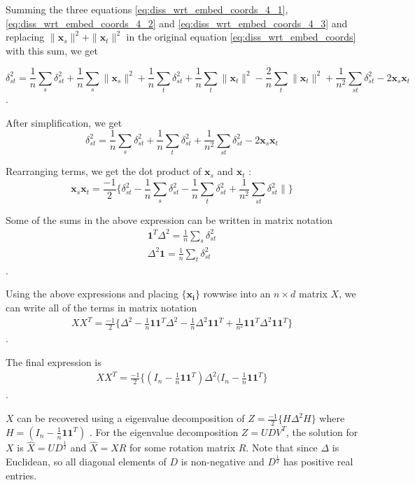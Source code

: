 \documentclass[12pt,oneside,final]{thesis}
\begin{document}
Summing the three equations 
\eqref{eq:diss_wrt_embed_coords_4_1}, \eqref{eq:diss_wrt_embed_coords_4_2}  and  \eqref{eq:diss_wrt_embed_coords_4_3} and replacing   $\|\bm{x}_{s}   \|^2 +\|\bm{x}_{t}\|^2$  in the original equation \eqref{eq:diss_wrt_embed_coords} with this sum, we get 

\[
\delta_{st}^2= \frac{1}{n}\sum_s{ \delta_{st}^2} + \frac{1}{n}\sum_s{\|\bm{x}_{s}}   \|^2 + \frac{1}{n}\sum_t{ \delta_{st}^2} + \frac{1}{n}\sum_t{\|\bm{x}_{t}}  \|^2  -\frac{2}{n}\sum_{t}{\|\bm{x}_{t}   \|^2} +\frac{1}{n^2}\sum_{st}{ \delta_{st}^2}   -2\bm{x}_{s}   \bm{x}_{t}  
\].

After simplification, we get
\[
\delta_{st}^2= \frac{1}{n}\sum_s{ \delta_{st}^2} +  \frac{1}{n}\sum_t{ \delta_{st}^2}  +\frac{1}{n^2}\sum_{st}{ \delta_{st}^2}  -2\bm{x}_{s}   \bm{x}_{t}   
\]

Rearranging terms, we get the dot product of $\bm{x}_{s}$ and $\bm{x}_{t}$ :
\[
\bm{x}_{s}   \bm{x}_{t} = \frac{-1}{2} \{\delta_{st}^2 - \frac{1}{n}\sum_s{ \delta_{st}^2} -  \frac{1}{n}\sum_t{ \delta_{st}^2}  +\frac{1}{n^2}\sum_{st}{ \delta_{st}^2 }     \| \}
\]



Some of the sums in the above expression can be written in matrix notation
\begin{align*}
\bm{1}^{T}\Delta^2= \frac{1}{n}\sum_s{ \delta_{st}^2}\\
\Delta^2 \bm{1} = \frac{1}{n}\sum_t{ \delta_{st}^2}
\end{align*}.

Using the above expressions and placing $\{\bm{x_i}\}$ rowwise into an $n \times d$ matrix $X$, we can write all of the terms in matrix notation
\begin{align*}
XX^T = \frac{-1}{2} \{\Delta^2 -  \frac{1}{n} \bm{1}\bm{1}^{T}\Delta^2  -  \frac{1}{n} \Delta^2 \bm{1}\bm{1}^{T} +   \frac{1}{n^2} \bm{1}\bm{1}^{T}\Delta^2 \bm{1}\bm{1}^{T}      \}
\end{align*}.

The final expression is 
\begin{align*}
XX^T = \frac{-1}{2} \{(I_n- \frac{1}{n}\bm{1}\bm{1}^{T})\Delta^2 (I_n- \frac{1}{n}\bm{1}\bm{1}^{T} \} 
\end{align*}.

$X$ can be recovered using a eigenvalue decomposition of $Z=\frac{-1}{2} \{ H \Delta^2 H\} $ where $H= (I_n- \frac{1}{n}\bm{1}\bm{1}^{T})$ . For the eigenvalue decomposition $Z=UDV^T$, the solution for $X$ is $\hat{X}=UD^{\frac{1}{2}}$ and  $\hat{X}=XR$ for some rotation matrix $R$. Note that since  $\Delta$ is Euclidean, so  all diagonal elements of $D$ is non-negative and $D^{\frac{1}{2}}$ has positive real entries. 
\end{document}
